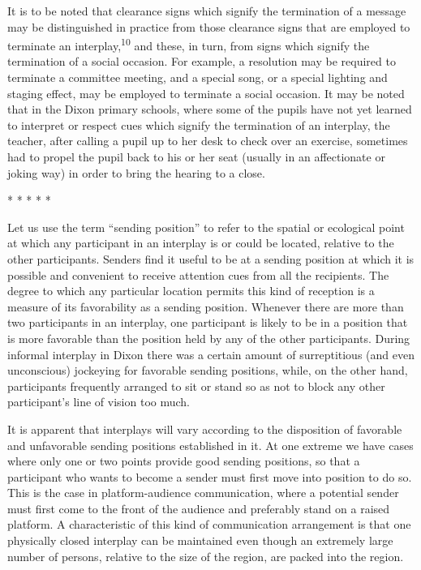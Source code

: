 \documentclass[twoside,symmetric,nobib,justified]{tufte-book}
\begin{document}
It is to be noted that clearance signs which signify the termination of
a message may be distinguished in practice from those clearance signs
that are employed to terminate an interplay,\textsuperscript{10} and these, in turn, from signs which signify the
termination of a social occasion. For example, a resolution may be
required to terminate a committee meeting, and a special song, or a
special lighting and staging effect, may be employed to terminate a
social occasion. It may be noted that in the Dixon primary schools,
where some of the pupils have not yet learned to interpret or respect
cues which signify the termination of an interplay, the teacher, after
calling a pupil up to her desk to check over an exercise, sometimes had
to propel the pupil back to his or her seat (usually in an affectionate
or joking way) in order to bring the hearing to a close.

\vspace{.2in}
\begin{centering}

\Large{* * * * *}

\end{centering}
\vspace{.17in}

\noindent Let us use the term ``sending position'' to refer to the spatial or
ecological point at which any participant in an interplay is or could be
located, relative to the other participants. Senders find it useful to
be at a sending position at which it is possible and convenient to
receive attention cues from all the recipients. The degree to which any
particular location permits this kind of reception is a measure of its
favorability as a sending position. Whenever there are more than two
participants in an interplay, one participant is likely to be in a
position that is more favorable than the position held by any of the
other participants. During informal interplay in Dixon there was a
certain amount of surreptitious (and even unconscious) jockeying for
favorable sending positions, while, on the other hand, participants
frequently arranged to sit or stand so as not to block any other
participant's line of vision too much.

It is apparent that interplays will vary according to the disposition of
favorable and unfavorable sending positions established in it. At one
extreme we have cases where only one or two points provide good sending
positions, so that a participant who wants to become a sender must first
move into position to do so. This is the case in platform-audience
communication, where a potential sender must first come to the front of
the audience and preferably stand on a raised platform. A characteristic
of this kind of communication arrangement is that one physically closed
interplay can be maintained even though an extremely large number of
persons, relative to the size of the region, are packed into the region.
\end{document}

